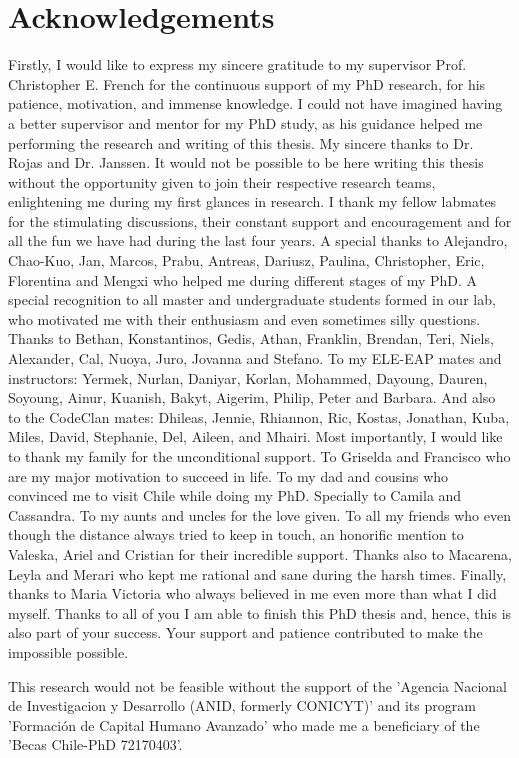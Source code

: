 \chapter{Acknowledgements}
Firstly, I would like to express my sincere gratitude to my supervisor Prof. Christopher E. French for the continuous support of my PhD research, for his patience, motivation, and immense knowledge. I could not have imagined having a better supervisor and mentor for my PhD study, as his guidance helped me performing the research and writing of this thesis.
My sincere thanks to Dr. Rojas and Dr. Janssen. It would not be possible to be here writing this thesis without the opportunity given to join their respective research teams, enlightening me during my first glances in research.
I thank my fellow labmates for the stimulating discussions, their constant support and encouragement and for all the fun we have had during the last four years. A special thanks to Alejandro, Chao-Kuo, Jan, Marcos, Prabu, Antreas, Dariusz, Paulina, Christopher, Eric, Florentina and Mengxi who helped me during different stages of my PhD. A special recognition to all master and undergraduate students formed in our lab, who motivated me with their enthusiasm and even sometimes silly questions. Thanks to Bethan, Konstantinos, Gedis, Athan, Franklin, Brendan, Teri, Niels, Alexander, Cal, Nuoya, Juro, Jovanna and Stefano. 
To my ELE-EAP mates and instructors: Yermek, Nurlan, Daniyar, Korlan, Mohammed, Dayoung, Dauren, Soyoung, Ainur, Kuanish, Bakyt, Aigerim, Philip, Peter and Barbara. And also to the CodeClan mates: Dhileas, Jennie, Rhiannon, Ric, Kostas, Jonathan, Kuba, Miles, David, Stephanie, Del, Aileen, and Mhairi.
Most importantly, I would like to thank my family for the unconditional support. To Griselda and Francisco who are my major motivation to succeed in life. To my dad and cousins who convinced me to visit Chile while doing my PhD. Specially to Camila and Cassandra. To my aunts and uncles for the love given. To all my friends who even though the distance always tried to keep in touch, an honorific mention to Valeska, Ariel and Cristian for their incredible support. Thanks also to Macarena, Leyla and Merari who kept me rational and sane during the harsh times. Finally, thanks to Maria Victoria who always believed in me even more than what I did myself. Thanks to all of you I am able to finish this PhD thesis and, hence, this is also part of your success. Your support and patience contributed to make the impossible possible.

This research would not be feasible without the support of the 'Agencia Nacional de Investigacion y Desarrollo (ANID, formerly CONICYT)' and its program 'Formación de Capital Humano Avanzado' who made me a beneficiary of the 'Becas Chile-PhD 72170403'.